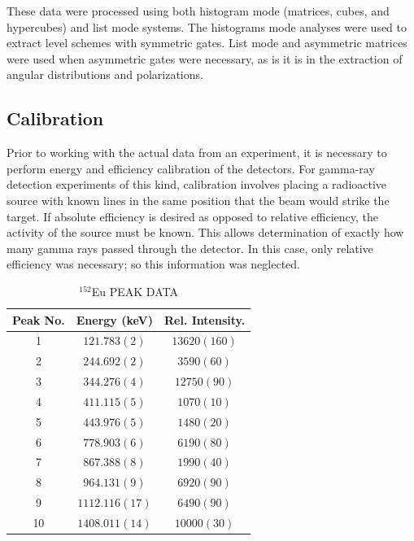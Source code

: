 These data were processed using both histogram mode (matrices, cubes, and hypercubes)\cite{radware} and list mode\cite{ROOT,blue} systems. The histograms mode analyses were used to extract level schemes with symmetric gates. List mode and asymmetric matrices were used when asymmetric gates were necessary, as is it is in the extraction of angular distributions and polarizations.
 
\subsection{Calibration}
\label{ssec:exp-pr-data-proc-cal}
Prior to working with the actual data from an experiment, it is necessary to perform energy and efficiency calibration of the detectors. For gamma-ray detection experiments of this kind, calibration involves placing a radioactive source with known lines in the same position that the beam would strike the target. If absolute efficiency is desired as opposed to relative efficiency, the activity of the source must be known. This allows determination of exactly how many gamma rays passed through the detector. In this case, only relative efficiency was necessary; so this information was neglected.

\begin{table}[ht!]
\caption{$^{152}$Eu PEAK DATA \label{tbl:152Eu-peaks}}
\begin{center}
\begin{tabular}{ccc}
\toprule
Peak No. & Energy (keV) & Rel. Intensity. \\ 
\midrule
1 & $121.783(2)$ & $13620(160)$ \\ 
2 & $244.692(2)$ & $3590(60)$ \\ 
3 & $344.276(4)$ & $12750(90)$ \\ 
4 & $411.115(5)$ & $1070(10)$ \\ 
5 & $443.976(5)$ & $1480(20)$ \\ 
6 & $778.903(6)$ & $6190(80)$ \\ 
7 & $867.388(8)$ & $1990(40)$ \\ 
8 & $964.131(9)$ & $6920(90)$ \\ 
9 & $1112.116(17)$ & $6490(90)$ \\ 
10 & $1408.011(14)$ & $10000(30)$ \\ 
\bottomrule
\end{tabular} 
\end{center}
\end{table}

